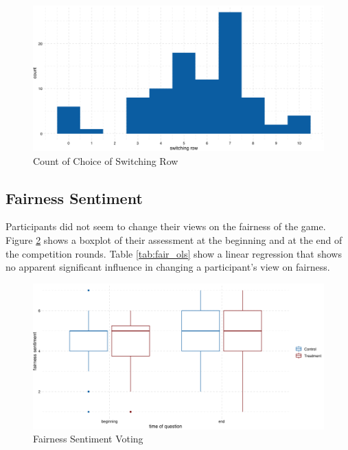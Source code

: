 \begin{figure}
    \centering
    \includegraphics[width=\textwidth]{graphs/hist_mpl.png}
    \caption{Count of Choice of Switching Row}
    \label{fig:hist_mpl}
\end{figure}

\subsection{Fairness Sentiment}

Participants did not seem to change their views on the fairness of the game. Figure \ref{fig:fairness_boxplot} shows a boxplot of their assessment at the beginning and at the end of the competition rounds. Table \ref{tab:fair_ols} show a linear regression that shows no apparent significant influence in changing a participant's view on fairness.\\

\begin{figure}
    \centering
    \includegraphics[width=\textwidth]{graphs/fairness_sentiment_boxplot.png}
    \caption{Fairness Sentiment Voting}
    \label{fig:fairness_boxplot}
\end{figure}



